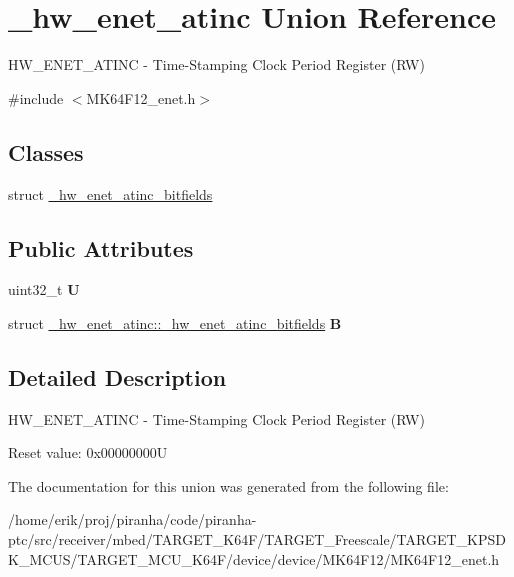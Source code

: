 \hypertarget{union__hw__enet__atinc}{}\section{\+\_\+hw\+\_\+enet\+\_\+atinc Union Reference}
\label{union__hw__enet__atinc}


H\+W\+\_\+\+E\+N\+E\+T\+\_\+\+A\+T\+I\+NC -\/ Time-\/\+Stamping Clock Period Register (RW)  




{\ttfamily \#include $<$M\+K64\+F12\+\_\+enet.\+h$>$}

\subsection*{Classes}
\begin{DoxyCompactItemize}
\item 
struct \hyperlink{struct__hw__enet__atinc_1_1__hw__enet__atinc__bitfields}{\+\_\+hw\+\_\+enet\+\_\+atinc\+\_\+bitfields}
\end{DoxyCompactItemize}
\subsection*{Public Attributes}
\begin{DoxyCompactItemize}
\item 
uint32\+\_\+t {\bfseries U}\hypertarget{union__hw__enet__atinc_aeedb817f305bffbc72ba86245876cf79}{}\label{union__hw__enet__atinc_aeedb817f305bffbc72ba86245876cf79}

\item 
struct \hyperlink{struct__hw__enet__atinc_1_1__hw__enet__atinc__bitfields}{\+\_\+hw\+\_\+enet\+\_\+atinc\+::\+\_\+hw\+\_\+enet\+\_\+atinc\+\_\+bitfields} {\bfseries B}\hypertarget{union__hw__enet__atinc_a6b8102af143a5ca792eb928cd3753f8f}{}\label{union__hw__enet__atinc_a6b8102af143a5ca792eb928cd3753f8f}

\end{DoxyCompactItemize}


\subsection{Detailed Description}
H\+W\+\_\+\+E\+N\+E\+T\+\_\+\+A\+T\+I\+NC -\/ Time-\/\+Stamping Clock Period Register (RW) 

Reset value\+: 0x00000000U 

The documentation for this union was generated from the following file\+:\begin{DoxyCompactItemize}
\item 
/home/erik/proj/piranha/code/piranha-\/ptc/src/receiver/mbed/\+T\+A\+R\+G\+E\+T\+\_\+\+K64\+F/\+T\+A\+R\+G\+E\+T\+\_\+\+Freescale/\+T\+A\+R\+G\+E\+T\+\_\+\+K\+P\+S\+D\+K\+\_\+\+M\+C\+U\+S/\+T\+A\+R\+G\+E\+T\+\_\+\+M\+C\+U\+\_\+\+K64\+F/device/device/\+M\+K64\+F12/M\+K64\+F12\+\_\+enet.\+h\end{DoxyCompactItemize}
